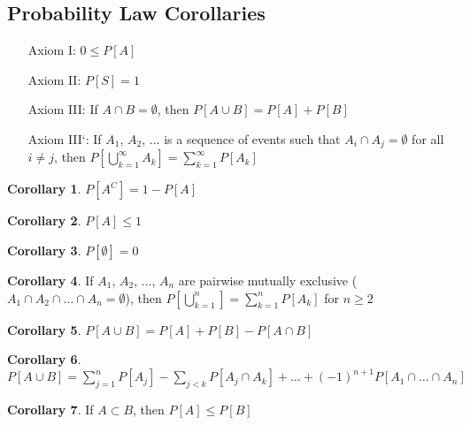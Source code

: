 \documentclass[10pt,letterpaper,final,twoside,notitlepage]{article}
\theoremstyle{plain}
\theoremstyle{definition}
\newtheorem{corollary}{Corollary}[section]
\begin{document}
	\subsection{Probability Law Corollaries} \label{subsec:Probability Law Corollary}
		\begin{itemize}[align=left, noitemsep, nolistsep] %
			\item[Axiom I:] $0 \leq P\left[ A \right]$
			\item[Axiom II:] $P \left[ S \right] = 1$
			\item[Axiom III:] If $A \cap B = \emptyset$, then $P \left[ A \cup B \right] = P \left[ A \right] + P \left[ B \right]$
			\item[Axiom III`:] If $A_{1}$, $A_{2}$, $\ldots$ is a sequence of events such that $A_{i} \cap A_{j} = \emptyset$ for all $i \neq j$, then $P \left[ \bigcup_{k=1}^{\infty} A_{k} \right] = \sum_{k=1}^{\infty} P \left[ A_{k} \right]$
		\end{itemize}
		\begin{corollary} \label{cor:Probability Parts}
			$P \left[ A^{C} \right] = 1 - P \left[ A \right]$
		\end{corollary}
		\begin{corollary} \label{cor:Probability of Event}
			$P \left[ A \right] \leq 1$
		\end{corollary}
		\begin{corollary} \label{cor:Probability of Empty Set}
			$P \left[ \emptyset \right] = 0$
		\end{corollary}
		\begin{corollary} \label{cor: Probability Addition of Disjoint Pairs}
			If $A_{1}$, $A_{2}$, $\ldots$, $A_{n}$ are pairwise mutually exclusive ($A_{1} \cap A_{2} \cap \ldots \cap A_{n} = \emptyset$), then $P \left[ \bigcup_{k=1}^{n} \right] = \sum_{k=1}^{n} P \left[ A_{k} \right]$ for $n \geq 2$
		\end{corollary}
		\begin{corollary} \label{cor:Inclusion-Exclusion Principle to 2 Sets}
			$P \left[ A \cup B \right] = P \left[ A \right] + P \left[ B \right] - P \left[ A \cap B \right]$
		\end{corollary}
		\begin{corollary} \label{cor:Inclusion-Exclusion Principle to n Sets}
			$P \left[ A \cup B \right] = \sum_{j=1}^{n} P \left[ A_{j} \right] - \sum_{j<k} P \left[A_{j} \cap A_{k} \right] + \ldots + \left( -1 \right)^{n+1} P \left[ A_{1} \cap \ldots \cap A_{n} \right]$
		\end{corollary}
		\begin{corollary} \label{cor:Subset Probability to Superset}
			If $A \subset B$, then $P \left[ A \right] \leq P \left[ B \right]$
		\end{corollary}
	
\end{document}
